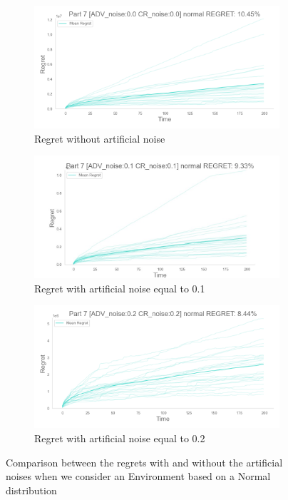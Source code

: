 \begin{figure}[!htb]
    \centering

    \begin{subfigure}[!H]{0.8\textwidth}
        \centering
        \includegraphics[width=\textwidth]{images/part7_normal_regret_noise00.png}
    	\caption{Regret without artificial noise}
    \end{subfigure}

    \begin{subfigure}[!H]{0.8\textwidth}
        \centering
        \includegraphics[width=\textwidth]{images/part7_normal_regret_noise01.jpeg}
    	\caption{Regret with artificial noise equal to 0.1}
    \end{subfigure}
    
    \begin{subfigure}[!H]{0.8\textwidth}
        \centering
        \includegraphics[width=\textwidth]{images/part7_normal_regret_noise02.png}
    	\caption{Regret with artificial noise equal to 0.2}
    \end{subfigure}
    
    \caption{Comparison between the regrets with and without the artificial noises when we consider an Environment based on a Normal distribution}
    \label{fig:RegretsPart7Normal}
\end{figure}